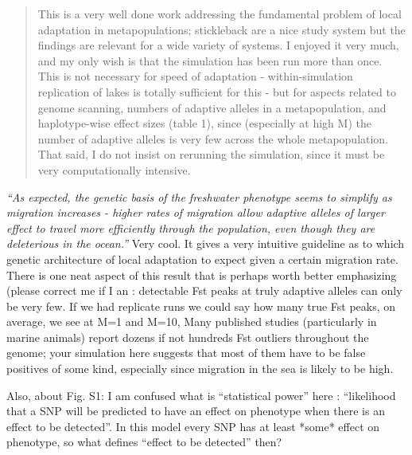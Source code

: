 



\begin{quote}
This is a very well done work addressing the fundamental problem of local
adaptation in metapopulations; stickleback are a nice study system but the
findings are relevant for a wide variety of systems. I enjoyed it very much,
and my only wish is that the simulation has been run more than once. This is
not necessary for speed of adaptation - within-simulation replication of lakes
is totally sufficient for this - but for aspects related to genome scanning,
numbers of adaptive alleles in a metapopulation, and haplotype-wise effect
sizes (table 1), since (especially at high M) the number of adaptive alleles is
very few across the whole metapopulation. That said, I do not insist on
rerunning the simulation, since it must be very computationally intensive.
\end{quote}


\begin{point}{}
    \textit{``As expected, the genetic basis of the freshwater phenotype seems to simplify
    as migration increases - higher rates of migration allow adaptive alleles of
    larger effect to travel more efficiently through the population, even though
    they are deleterious in the ocean.''}
    Very cool. It gives a very intuitive guideline as to which genetic
    architecture of local adaptation to expect given a certain migration rate.
    There is one neat aspect of this result that is perhaps worth better
    emphasizing (please correct me if I an : detectable Fst peaks at truly adaptive
    alleles can only be very few. If we had replicate runs we could say how many
    true Fst peaks, on average, we see at M=1 and M=10, Many published studies
    (particularly in marine animals) report dozens if not hundreds Fst outliers
    throughout the genome; your simulation here suggests that most of them have to
    be false positives of some kind, especially since migration in the sea is
    likely to be high.
\end{point}

\reply{
}


\begin{point}{}
Also, about Fig. S1: I am confused what is ``statistical power'' here :
``likelihood that a SNP will be predicted to have an effect on phenotype when
there is an effect to be detected''. In this model every SNP has at least *some*
effect on phenotype, so what defines ``effect to be detected'' then?
\end{point}

